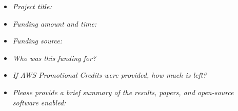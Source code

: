 \documentclass[titlesec]{araproposal}
\begin{document}
\begin{itemize}
  \item \textit{Project title:}
  \item \textit{Funding amount and time:}
  \item \textit{Funding source:}
  \item \textit{Who was this funding for?}
  \item \textit{If AWS Promotional Credits were provided, how much is left?}
  \item \textit{Please provide a brief summary of the results, papers, and open-source software enabled:}
\end{itemize}
\end{document}
